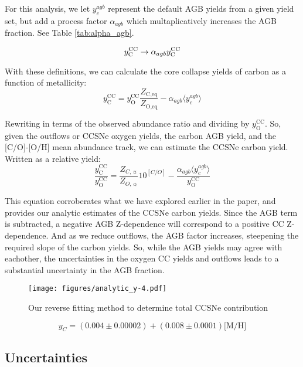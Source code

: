 \documentclass[fleqn,usenatbib]{mnras}
\begin{document}
For this analysis, we let $y_c^{agb}$ represent the default AGB yields from a given yield set, but add a process factor $\alpha_{agb}$ which multaplicatively increases the AGB fraction. See Table \ref{tab:alpha_agb}.

\begin{equation}
    y_{\rm C}^{\rm CC} \rightarrow \alpha_{agb}  y_{\rm C}^{\rm CC}
\end{equation}

With these definitions, we can calculate the core collapse yields of carbon as a function of metallicity:
\begin{equation}
    y_\text{C}^\text{CC} =  y_\text{O}^\text{CC} \frac{Z_\text{C,eq}}{Z_\text{O,eq}} - \alpha_{agb} \langle y_c^{agb} \rangle
\end{equation}

Rewriting in terms of the observed abundance ratio and dividing by $y_\text{O}^\text{CC}$. So, given the outflows or CCSNe oxygen yields, the carbon AGB yield, and the [C/O]-[O/H] mean abundance track, we can estimate the CCSNe carbon yield. Written as a relative yield:
\begin{equation}
    \frac{y_\text{C}^\text{CC}}{y_\text{O}^\text{CC}} = \frac{Z_{C, \sun}}{Z_{O, \sun}} 10^{[C/O]} - \frac{\alpha_{agb} \langle y_c^{agb} \rangle}{ y_\text{O}^\text{CC}}
\end{equation}

This equation corroberates what we have explored earlier in the paper, and provides our analytic estimates of the CCSNe carbon yields. Since the AGB term is subtracted, a negative AGB Z-dependence will correspond to a positive CC Z-dependence. And as we reduce outflows, the AGB factor increases, steepening the required slope of the carbon yields. So, while the AGB yields may agree with eachother, the uncertainties in the oxygen CC yields and outflows leads to a substantial uncertainty in the AGB fraction.  

\begin{figure}
    \centering
    \texttt{[image: figures/analytic\_y-4.pdf]}
    \caption{Our reverse fitting method to determine total CCSNe contribution}
\end{figure}

\begin{equation}
    y_C = (0.004 \pm 0.00002) + (0.008 \pm 0.0001) \text{[M/H]} 
\end{equation}

\subsection{Uncertainties}
\end{document}
